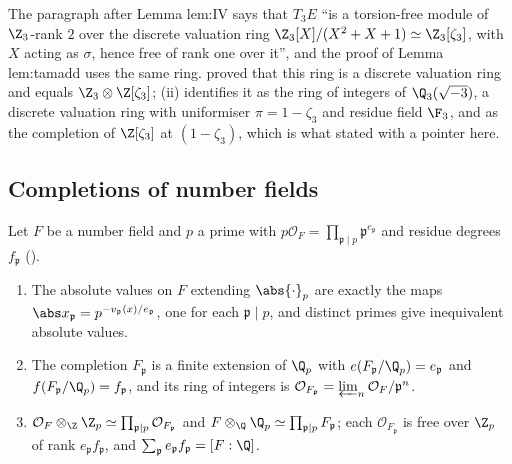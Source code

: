 \begin{paperlink}\label{pl:local:z3zeta3}
The paragraph after Lemma lem:IV says that $T_3E$ ``is a torsion-free module of $\Z_3$-rank $2$ over the discrete valuation ring $\Z_3[X]/(X^2+X+1)\simeq\Z_3[\zeta_3]$, with $X$ acting as $\sigma$, hence free of rank one over it'', and
the proof of Lemma lem:tamadd uses the same ring.  proved that this ring is a discrete valuation ring and equals $\Z_3\otimes\Z[\zeta_3]$;
(ii) identifies it as the ring of integers of $\Q_3(\sqrt{-3})$, a discrete valuation ring with uniformiser $\pi=1-\zeta_3$ and residue
field $\F_3$, and as the completion of $\Z[\zeta_3]$ at $(1-\zeta_3)$, which is what  stated with a pointer here.
\end{paperlink}

\subsection{Completions of number fields}

\begin{theorem}\label{thm:local:completion-numberfield}
Let $F$ be a number field and $p$ a prime with $p\mathcal O_F=\prod_{\mathfrak p\mid p}\mathfrak p^{e_{\mathfrak p}}$ and residue degrees $f_{\mathfrak p}$
().
\begin{enumerate}[label=(\roman*)]
\item The absolute values on $F$ extending $\abs{\cdot}_p$ are exactly the maps $\abs x_{\mathfrak p}=p^{-v_{\mathfrak p}(x)/e_{\mathfrak p}}$, one for each $\mathfrak p\mid p$,
and distinct primes give inequivalent absolute values.
\item The completion $F_{\mathfrak p}$ is a finite extension of $\Q_p$ with $e(F_{\mathfrak p}/\Q_p)=e_{\mathfrak p}$ and $f(F_{\mathfrak p}/\Q_p)=f_{\mathfrak p}$, and
its ring of integers is $\mathcal O_{F_{\mathfrak p}}=\varprojlim_n\mathcal O_F/\mathfrak p^n$.
\item $\mathcal O_F\otimes_\Z\Z_p\simeq\prod_{\mathfrak p\mid p}\mathcal O_{F_{\mathfrak p}}$ and $F\otimes_\Q\Q_p\simeq\prod_{\mathfrak p\mid p}F_{\mathfrak p}$; each
$\mathcal O_{F_{\mathfrak p}}$ is free over $\Z_p$ of rank $e_{\mathfrak p}f_{\mathfrak p}$, and $\sum_{\mathfrak p}e_{\mathfrak p}f_{\mathfrak p}=[F:\Q]$.
\end{enumerate}
\end{theorem}

